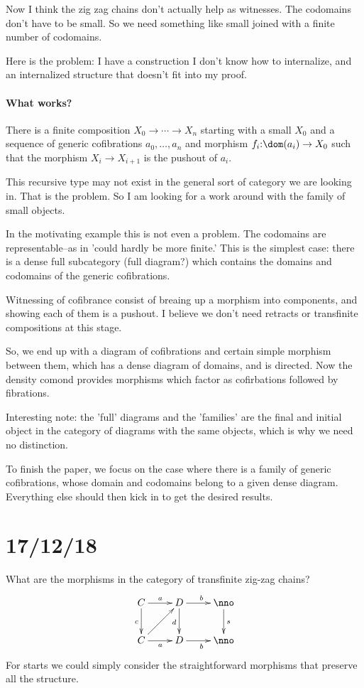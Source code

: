 \documentclass[csh.tex]{subfiles}
\begin{document}
Now I think the zig zag chains don't actually help as witnesses. The codomains don't have to be small. So we need something like small joined with a finite number of codomains.

Here is the problem: I have a construction I don't know how to internalize, and an internalized structure that doesn't fit into my proof. 

\paragraph{What works?}
There is a finite composition $X_0\to\dotsm\to X_n$ starting with a small $X_0$ and a sequence of generic cofibrations $a_0,\dotsc,a_n$ and morphism $f_i\of \dom(a_i)\to X_0$ such that the morphism $X_i\to X_{i+1}$ is the pushout of $a_i$.

This recursive type may not exist in the general sort of category we are looking in. That is the problem. So I am looking for a work around with the family of small objects.

In the motivating example this is not even a problem. The codomains are representable--as in 'could hardly be more finite.' This is the simplest case: there is a dense full subcategory (full diagram?) which contains the domains and codomains of the generic cofibrations.

Witnessing of cofibrance consist of breaing up a morphism into components, and showing each of them is a pushout. I believe we don't need retracts or transfinite compositions at this stage.

So, we end up with a diagram of cofibrations and certain simple morphism between them, which has a dense diagram of domains, and is directed. Now the density comond provides morphisms which factor as cofirbations followed by fibrations.

Interesting note: the 'full' diagrams and the 'families' are the final and initial object in the category of diagrams with the same objects, which is why we need no distinction.

To finish the paper, we focus on the case where there is a family of generic cofibrations, whose domain and codomains belong to a given dense diagram. Everything else should then kick in to get the desired results.

\section{17/12/18}
What are the morphisms in the category of transfinite zig-zag chains?
\[\xymatrix{
	C \ar[r]^a \ar[d]_c & D \ar[r]^b\ar[d]_d & \nno\ar[d]^s\\
	C \ar[r]_a \ar[ur] & D \ar[r]_b & \nno
}\]
For starts we could simply consider the straightforward morphisms that preserve all the structure.
\end{document}
